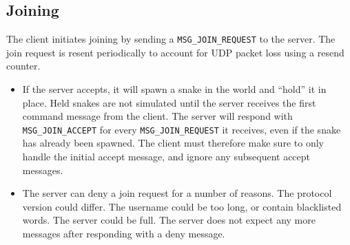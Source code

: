 \subsection{Joining}

\begin{center}

\end{center}

The  client  initiates  joining  by  sending  a \verb$MSG_JOIN_REQUEST$ to the
server.  The  join  request is resent periodically to account for  UDP  packet
loss using a resend counter.

\begin{itemize}
\item If the server accepts, it  will  spawn a snake in the world and ``hold''
it in place. Held snakes are not simulated until the server receives the first
command   message   from   the   client.   The   server  will   respond   with
\verb$MSG_JOIN_ACCEPT$ for every \verb$MSG_JOIN_REQUEST$ it receives, even  if
the  snake has already been spawned. The client must therefore  make  sure  to
only  handle  the  initial  accept  message,  and ignore any subsequent accept
messages.
\item The server can deny a join request for a number of reasons. The protocol
version could differ. The  username  could be too long, or contain blacklisted
words. The  server could be full. The server does not expect any more messages
after responding with a deny message.
\end{itemize}

\vspace{1.5em}

\begin{figure}[h]

\end{figure}

\vspace{1.5em}

\begin{figure}[h]

\end{figure}
